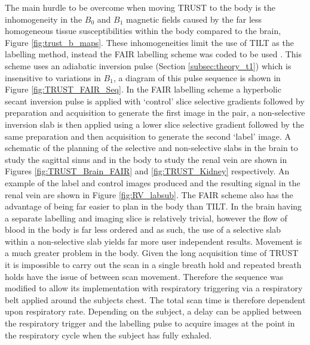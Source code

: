 The main hurdle to be overcome when moving \ac{TRUST} to the body is the inhomogeneity in the $B_0$ and $B_1$ magnetic fields caused by the far less homogeneous tissue susceptibilities within the body compared to the brain, Figure \ref{fig:trust_b_maps}. These inhomogeneities limit the use of \ac{TILT} as the labelling method, instead the \ac{FAIR} labelling scheme was coded to be used \cite{martirosian_fair_2004}. This scheme uses an adiabatic inversion pulse (Section \ref{subsec:theory_t1}) which is insensitive to variations in $B_1$, a diagram of this pulse sequence is shown in Figure \ref{fig:TRUST_FAIR_Seq}. In the \ac{FAIR} labelling scheme a hyperbolic secant inversion pulse is applied with `control' slice selective gradients  followed by \ttwo preparation and acquisition to generate the first image in the pair, a non-selective inversion slab is then applied using a lower slice selective gradient followed by the same \ttwo preparation and then acquisition to generate the second `label' image. A schematic of the planning of the selective and non-selective slabs in the brain to study the sagittal sinus and in the body to study the renal vein are shown in Figures \ref{fig:TRUST_Brain_FAIR} and \ref{fig:TRUST_Kidney} respectively. An example of the label and control images produced and the resulting signal in the renal vein are shown in Figure \ref{fig:RV_labsub}. The \ac{FAIR} scheme also has the advantage of being far easier to plan in the body than \ac{TILT}. In the brain having a separate labelling and imaging slice is relatively trivial, however the flow of blood in the body is far less ordered and as such, the use of a selective slab within a non-selective slab yields far more user independent results. Movement is a much greater problem in the body. Given the long acquisition time of \ac{TRUST} it is impossible to carry out the scan in a single breath hold and repeated breath holds have the issue of between scan movement. Therefore the sequence was modified to allow its implementation with respiratory triggering via a respiratory belt applied around the subjects chest. The total scan time is therefore dependent upon respiratory rate. Depending on the subject, a delay can be applied between the respiratory trigger and the labelling pulse to acquire images at the point in the respiratory cycle when the subject has fully exhaled.

